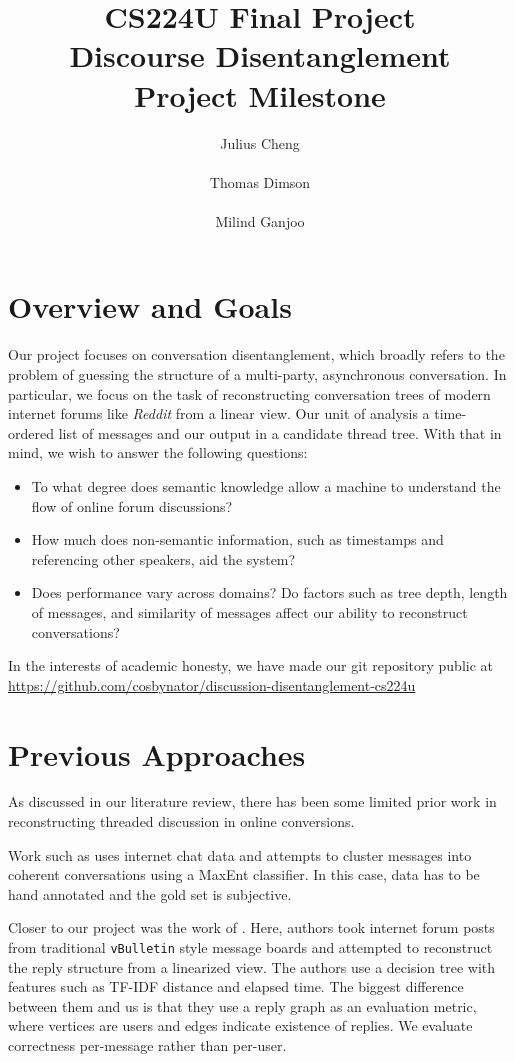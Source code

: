\documentclass[10pt]{article}
\title{{\small CS224U Final Project} \\ Discourse Disentanglement \\{\small Project Milestone}}
\author{Julius Cheng \\
  \\\And
  Thomas Dimson  \\
  \\\And
  Milind Ganjoo \\
}
\date{}
\begin{document}
\maketitle

\section{Overview and Goals}
Our project focuses on conversation disentanglement, which broadly refers to
the problem of guessing the structure of a multi-party, asynchronous
conversation. In particular, we focus on the task of reconstructing conversation
trees of modern internet forums like \textit{Reddit} from a linear view. Our unit of 
analysis a time-ordered list of messages and our output in a candidate thread tree. 
With that in mind, we wish to answer the following questions:

\begin{itemize}
  \item To what degree does semantic knowledge allow a machine to understand the 
    flow of online forum discussions?
  \item How much does non-semantic information, such as timestamps and referencing
  other speakers, aid the system?
  \item Does performance vary across domains? Do factors such as tree depth,
    length of messages, and similarity of messages affect our ability to
    reconstruct conversations? 
\end{itemize}

In the interests of academic honesty, we have made our git repository public at
\url{https://github.com/cosbynator/discussion-disentanglement-cs224u}

\section{Previous Approaches}
\label{sec:approaches}
As discussed in our literature review, there has been some limited prior 
work in reconstructing threaded discussion in online conversions. 

Work such as \cite{Elsner2008a} 
uses internet chat data and attempts to cluster messages into coherent 
conversations using a MaxEnt classifier. In this case, data has to be hand annotated and
the gold set is subjective.

Closer to our project was the work of \cite{Aumayr2011a}. Here, authors took
internet forum posts from traditional \texttt{vBulletin} style message boards
and attempted to reconstruct the reply structure from a linearized view. The authors
use a decision tree with features such as TF-IDF distance and elapsed time. The biggest
difference between them and us is that they use a reply graph as an evaluation metric,
where vertices are users and edges indicate existence of replies. We evaluate correctness
per-message rather than per-user.
\end{document}
